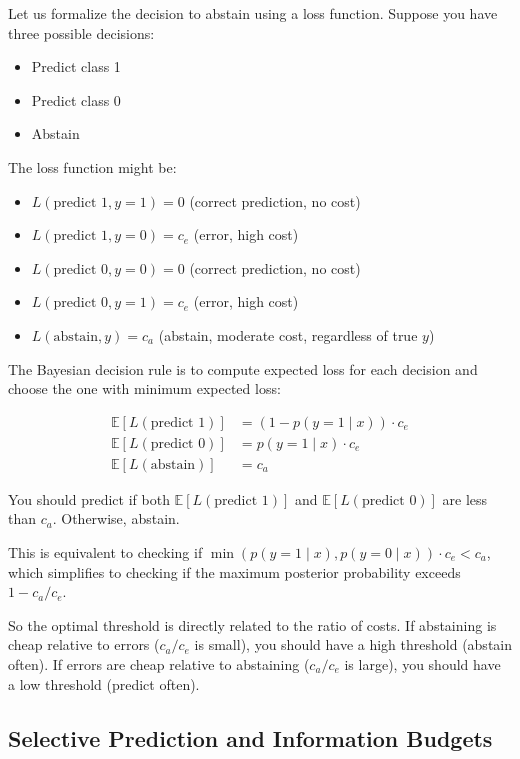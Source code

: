 Let us formalize the decision to abstain using a loss function. Suppose you have three possible decisions:

\begin{itemize}
\item Predict class 1
\item Predict class 0
\item Abstain
\end{itemize}

The loss function might be:

\begin{itemize}
\item $L(\text{predict 1}, y=1) = 0$ (correct prediction, no cost)
\item $L(\text{predict 1}, y=0) = c_e$ (error, high cost)
\item $L(\text{predict 0}, y=0) = 0$ (correct prediction, no cost)
\item $L(\text{predict 0}, y=1) = c_e$ (error, high cost)
\item $L(\text{abstain}, y) = c_a$ (abstain, moderate cost, regardless of true $y$)
\end{itemize}

The Bayesian decision rule is to compute expected loss for each decision and choose the one with minimum expected loss:

\begin{align}
\mathbb{E}[L(\text{predict 1})] &= (1 - p(y=1 \mid x)) \cdot c_e \\
\mathbb{E}[L(\text{predict 0})] &= p(y=1 \mid x) \cdot c_e \\
\mathbb{E}[L(\text{abstain})] &= c_a
\end{align}

You should predict if both $\mathbb{E}[L(\text{predict 1})]$ and $\mathbb{E}[L(\text{predict 0})]$ are less than $c_a$. Otherwise, abstain.

This is equivalent to checking if $\min(p(y=1 \mid x), p(y=0 \mid x)) \cdot c_e < c_a$, which simplifies to checking if the maximum posterior probability exceeds $1 - c_a / c_e$.

So the optimal threshold is directly related to the ratio of costs. If abstaining is cheap relative to errors ($c_a / c_e$ is small), you should have a high threshold (abstain often). If errors are cheap relative to abstaining ($c_a / c_e$ is large), you should have a low threshold (predict often).

\subsection{Selective Prediction and Information Budgets}

